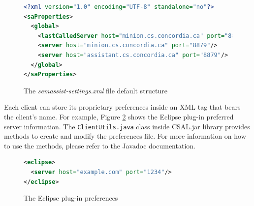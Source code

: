 \begin{figure}[!tb]
\begin{lstlisting}[language=XML,xleftmargin=4mm,columns=flexible]
<?xml version="1.0" encoding="UTF-8" standalone="no"?>
<saProperties>
  <global>
    <lastCalledServer host="minion.cs.concordia.ca" port="8879"/>
    <server host="minion.cs.concordia.ca" port="8879"/>
    <server host="assistant.cs.concordia.ca" port="8879"/>
  </global>
</saProperties>
\end{lstlisting}
\caption{The \emph{semassist-settings.xml} file default structure}
\label{list:semassist-settings}
\end{figure}

Each client can store its proprietary preferences inside an XML tag that bears the client's name. For example, Figure \ref{list:eclipse-pref} shows the Eclipse plug-in preferred server information. The \texttt{ClientUtils.java} class inside CSAL.jar library provides methods to create and modify the preferences file. For more information on how to use the methods, please refer to the Javadoc documentation.

\begin{figure}[!tb]
\begin{lstlisting}[language=XML,xleftmargin=4mm,columns=flexible]
<eclipse>
  <server host="example.com" port="1234"/>
</eclipse>
\end{lstlisting}
\caption{The Eclipse plug-in preferences}
\label{list:eclipse-pref}
\end{figure}